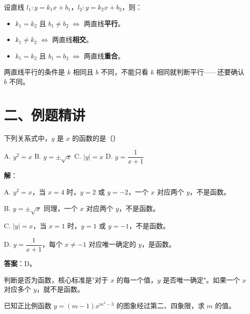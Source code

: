 \documentclass[12pt, a4paper]{ctexart}
\begin{document}
\begin{knowledgebox}[两条直线的位置关系]
设直线 $l_1: y = k_1 x + b_1$，$l_2: y = k_2 x + b_2$，则：
\begin{itemize}[leftmargin=2em]
  \item $k_1 = k_2$ 且 $b_1 \neq b_2$ $\Longleftrightarrow$ 两直线\textbf{平行}。
  \item $k_1 \neq k_2$ $\Longleftrightarrow$ 两直线\textbf{相交}。
  \item $k_1 = k_2$ 且 $b_1 = b_2$ $\Longleftrightarrow$ 两直线\textbf{重合}。
\end{itemize}
\end{knowledgebox}

\begin{warnbox}[易错提醒]
两直线平行的条件是 $k$ 相同且 $b$ 不同，不能只看 $k$ 相同就判断平行——还要确认 $b$ 不同。
\end{warnbox}

\section*{\textcolor{examorange}{二、例题精讲}}

\begin{examplebox}
下列关系式中，$y$ 是 $x$ 的函数的是\quad（\quad）

A. $y^2 = x$ \quad B. $y = \pm\sqrt{x}$ \quad C. $|y| = x$ \quad D. $y = \dfrac{1}{x+1}$
\end{examplebox}

\textbf{解}：

A. $y^2 = x$，当 $x = 4$ 时，$y = 2$ 或 $y = -2$，一个 $x$ 对应两个 $y$，不是函数。

B. $y = \pm\sqrt{x}$ 同理，一个 $x$ 对应两个 $y$，不是函数。

C. $|y| = x$，当 $x = 1$ 时，$y = 1$ 或 $y = -1$，不是函数。

D. $y = \dfrac{1}{x+1}$，每个 $x\neq -1$ 对应唯一确定的 $y$，是函数。

\textbf{答案}：D。

\begin{tipbox}[方法总结]
判断是否为函数，核心标准是"对于 $x$ 的每一个值，$y$ 是否唯一确定"。如果一个 $x$ 对应多个 $y$，就不是函数。
\end{tipbox}

\begin{examplebox}[【例题2】正比例函数的图象与性质]
已知正比例函数 $y = (m-1)x^{m^2-3}$ 的图象经过第二、四象限，求 $m$ 的值。
\end{examplebox}
\end{document}
